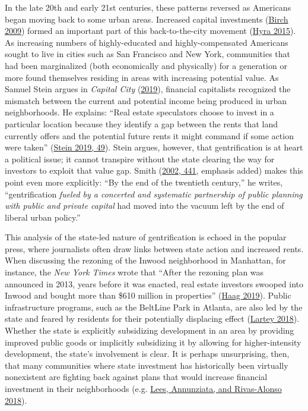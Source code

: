 \documentclass[
  12pt,
]{article}
\begin{document}
In the late 20th and early 21st centuries, these patterns reversed as Americans began moving back to some urban areas. Increased capital investments (\protect\hyperlink{ref-Birch2009}{Birch 2009}) formed an important part of this back-to-the-city movement (\protect\hyperlink{ref-Hyra2015}{Hyra 2015}). As increasing numbers of highly-educated and highly-compensated Americans sought to live in cities such as San Francisco and New York, communities that had been marginalized (both economically and physically) for a generation or more found themselves residing in areas with increasing potential value. As Samuel Stein argues in \emph{Capital City} (\protect\hyperlink{ref-Stein2019}{2019}), financial capitalists recognized the mismatch between the current and potential income being produced in urban neighborhoods. He explains: ``Real estate speculators choose to invest in a particular location because they identify a gap between the rents that land currently offers and the potential future rents it might command if some action were taken'' (\protect\hyperlink{ref-Stein2019}{Stein 2019, 49}). Stein argues, however, that gentrification is at heart a political issue; it cannot transpire without the state clearing the way for investors to exploit that value gap. Smith (\protect\hyperlink{ref-Smith2002}{2002, 441}, emphasis added) makes this point even more explicitly: ``By the end of the twentieth century,'' he writes, ``gentrification \emph{fueled by a concerted and systematic partnership of public planning with public and private capital} had moved into the vacuum left by the end of liberal urban policy.''

This analysis of the state-led nature of gentrification is echoed in the popular press, where journalists often draw links between state action and increased rents. When discussing the rezoning of the Inwood neighborhood in Manhattan, for instance, the \emph{New York Times} wrote that ``After the rezoning plan was announced in 2013, years before it was enacted, real estate investors swooped into Inwood and bought more than \$610 million in properties'' (\protect\hyperlink{ref-Haag2019}{Haag 2019}). Public infrastructure programs, such as the BeltLine Park in Atlanta, are also led by the state and feared by residents for their potentially displacing effect (\protect\hyperlink{ref-Lartey2018}{Lartey 2018}). Whether the state is explicitly subsidizing development in an area by providing improved public goods or implicitly subsidizing it by allowing for higher-intensity development, the state's involvement is clear. It is perhaps unsurprising, then, that many communities where state investment has historically been virtually nonexistent are fighting back against plans that would increase financial investment in their neighborhoods (e.g. \protect\hyperlink{ref-Lees2018}{Lees, Annunziata, and Rivas-Alonso 2018}).
\end{document}
